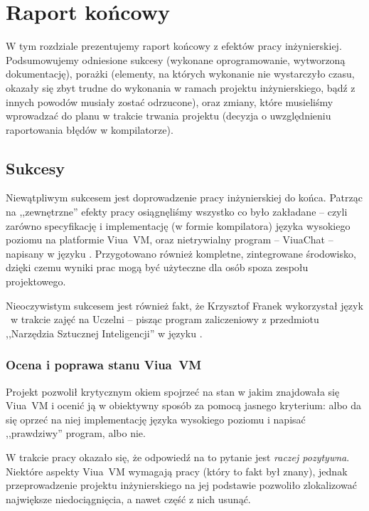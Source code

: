 \chapter{Raport końcowy}
\label{raport_koncowy}

W tym rozdziale prezentujemy raport końcowy z efektów pracy inżynierskiej.
Podsumowujemy odniesione sukcesy (wykonane oprogramowanie, wytworzoną dokumentację), porażki (elementy, na
których wykonanie nie wystarczyło czasu, okazały się zbyt trudne do wykonania w ramach projektu
inżynierskiego, bądź z innych powodów musiały zostać odrzucone), oraz zmiany, które musieliśmy wprowadzać do
planu w trakcie trwania projektu (decyzja o uwzględnieniu raportowania błędów w kompilatorze).

\section{Sukcesy}

Niewątpliwym sukcesem jest doprowadzenie pracy inżynierskiej do końca. Patrząc
na ,,zewnętrzne'' efekty pracy osiągnęliśmy wszystko co było zakładane -- czyli
zarówno specyfikację i implementację (w formie kompilatora) języka wysokiego
poziomu na platformie Viua~VM, oraz nietrywialny program -- ViuaChat -- napisany
w języku \ViuAct. Przygotowano również kompletne, zintegrowane środowisko,
dzięki czemu wyniki prac mogą być użyteczne dla osób spoza zespołu projektowego.

Nieoczywistym sukcesem jest również fakt, że Krzysztof Franek wykorzystał język
\ViuAct\ w trakcie zajęć na Uczelni -- pisząc program zaliczeniowy z
przedmiotu ,,Narzędzia Sztucznej Inteligencji'' w języku \ViuAct.

\subsection{Ocena i poprawa stanu Viua~VM}

Projekt pozwolił krytycznym okiem spojrzeć na stan w jakim znajdowała się
Viua~VM i ocenić ją w obiektywny sposób za pomocą jasnego kryterium: albo da się
oprzeć na niej implementację języka wysokiego poziomu i napisać ,,prawdziwy''
program, albo nie.

W trakcie pracy okazało się, że odpowiedź na to pytanie jest \emph{raczej
pozytywna}. Niektóre aspekty Viua~VM wymagają pracy (który to fakt był znany),
jednak przeprowadzenie projektu inżynierskiego na jej podstawie pozwoliło
zlokalizować największe niedociągnięcia, a nawet część z nich usunąć.

